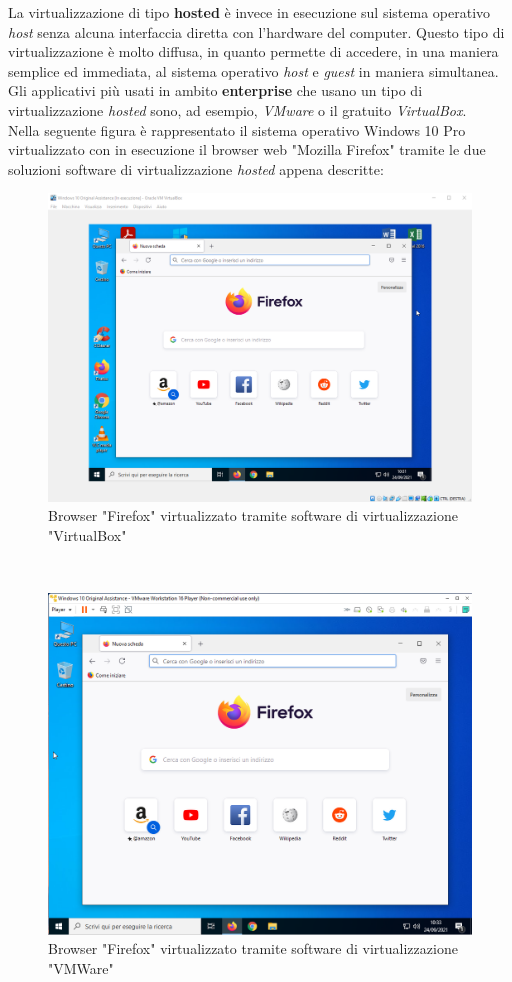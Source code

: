 La virtualizzazione di tipo \textbf{hosted} è invece in esecuzione sul sistema operativo \textit{host} senza alcuna interfaccia diretta con l'hardware del computer. Questo tipo di virtualizzazione è molto diffusa, in quanto permette di accedere, in una maniera semplice ed immediata, al sistema operativo \textit{host} e \textit{guest} in maniera simultanea. Gli applicativi più usati in ambito \textbf{enterprise} che usano un tipo di virtualizzazione \textit{hosted} sono, ad esempio, \textit{VMware} o il gratuito \textit{VirtualBox}.\\
Nella seguente figura è rappresentato il sistema operativo Windows 10 Pro virtualizzato con in esecuzione il browser web "Mozilla Firefox" tramite le due soluzioni software di virtualizzazione \textit{hosted} appena descritte:
\begin{figure}[!h]     
\centering 
    \includegraphics[width=0.6\columnwidth]{immagini/screenshot/firefox_virtualbox} 
    \caption{Browser "Firefox" virtualizzato tramite software di virtualizzazione "VirtualBox"}
\end{figure} \\

\begin{figure}[!h]     
\centering 
    \includegraphics[width=0.6\columnwidth]{immagini/screenshot/firefox_vmware} 
    \caption{Browser "Firefox" virtualizzato tramite software di virtualizzazione "VMWare"}
\end{figure}

